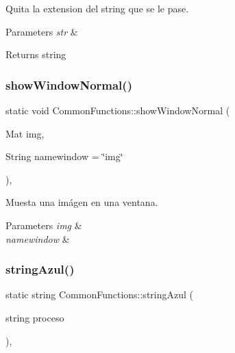 Quita la extension del string que se le pase. 


\begin{DoxyParams}{Parameters}
{\em str} & \\
\hline
\end{DoxyParams}
\begin{DoxyReturn}{Returns}
string 
\end{DoxyReturn}
\mbox{\label{classCommonFunctions_a71529e35a71bbc74d49051d90a850c30}} 
\subsubsection{\texorpdfstring{show\+Window\+Normal()}{showWindowNormal()}}
{\footnotesize\ttfamily static void Common\+Functions\+::show\+Window\+Normal (\begin{DoxyParamCaption}\item[{Mat}]{img,  }\item[{String}]{namewindow = {\ttfamily \char`\"{}img\char`\"{}} }\end{DoxyParamCaption})\hspace{0.3cm}{\ttfamily [inline]}, {\ttfamily [static]}}



Muesta una imágen en una ventana. 


\begin{DoxyParams}{Parameters}
{\em img} & \\
\hline
{\em namewindow} & \\
\hline
\end{DoxyParams}
\mbox{\label{classCommonFunctions_a62aed3b1ac21b7d1d813e39be5693dc1}} 
\subsubsection{\texorpdfstring{string\+Azul()}{stringAzul()}}
{\footnotesize\ttfamily static string Common\+Functions\+::string\+Azul (\begin{DoxyParamCaption}\item[{string}]{proceso }\end{DoxyParamCaption})\hspace{0.3cm}{\ttfamily [inline]}, {\ttfamily [static]}}



